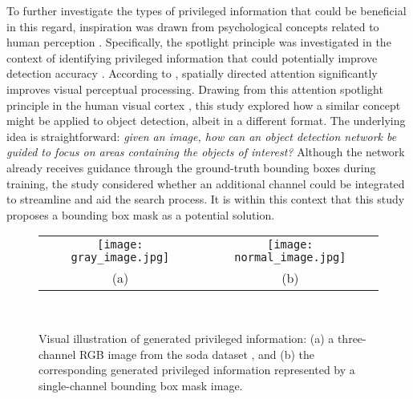 To further investigate the types of privileged information that could be beneficial in this regard, inspiration was drawn from psychological concepts related to human perception \cite{itti_ior, spotlight}. Specifically, the spotlight principle was investigated in the context of identifying privileged information that could potentially improve detection accuracy \cite{spotlight}. According to \cite{spotlight}, spatially directed attention significantly improves visual perceptual processing. Drawing from this attention spotlight principle in the human visual cortex \cite{spotlight}, this study explored how a similar concept might be applied to object detection, albeit in a different format. The underlying idea is straightforward: \textit{given an image, how can an object detection network be guided to focus on areas containing the objects of interest?}
Although the network already receives guidance through the ground-truth bounding boxes during training, the study considered whether an additional channel could be integrated to streamline and aid the search process. It is within this context that this study proposes a bounding box mask as a potential solution.

\begin{figure}[!htbp]
  \centering
  \begin{tabular}{cc}
    \texttt{[image: gray\_image.jpg]} &
    \texttt{[image: normal\_image.jpg]} \\
    \small (a) & \small (b) \\
  \end{tabular}\\
  \caption{Visual illustration of generated privileged information: (a) a three-channel RGB image from the \gls{soda} dataset \cite{soda_dataset}, and (b) the corresponding generated privileged information represented by a single-channel bounding box mask image.}
  \label{fig:privileged_visual}
\end{figure}


